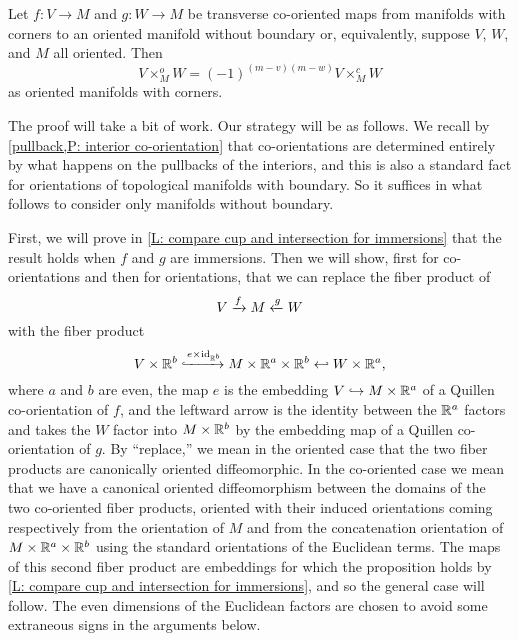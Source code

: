 \begin{proposition}\label{P: compare cup and intersection orientations}
	Let $f \colon V \to M$ and $g \colon W \to M$ be transverse co-oriented maps from manifolds with corners to an oriented manifold without boundary or, equivalently, suppose $V$, $W$, and $M$ all oriented.
	Then $$V \times_M^o W = (-1)^{(m-v)(m-w)} V \times_M^c W$$ as oriented manifolds with corners.
\end{proposition}

The proof will take a bit of work.
Our strategy will be as follows.
We recall by \cref{pullback,P: interior co-orientation} that co-orientations are determined entirely by what happens on the pullbacks of the interiors, and this is also a standard fact for orientations of topological manifolds with boundary.
So it suffices in what follows to consider only manifolds without boundary.

First, we will prove in \cref{L: compare cup and intersection for immersions} that the result holds when $f$ and $g$ are immersions.
Then we will show, first for co-orientations and then for orientations, that we can replace the fiber product of
$$V \xrightarrow{f} M \xleftarrow{g} W$$
with the fiber product
$$V \times \mathbb{R}^b \xhookrightarrow{e \times \mathrm{id}_{\mathbb{R}^b }} M \times \mathbb{R}^a \times \mathbb{R}^b \hookleftarrow W \times \mathbb{R}^a ,$$
where $a$ and $b$ are even, the map $e$ is the embedding $V \hookrightarrow M \times \mathbb{R}^a $ of a Quillen co-orientation of $f$, and the leftward arrow is the identity between the $\mathbb{R}^a $ factors and takes the $W$ factor into $M \times \mathbb{R}^b $ by the embedding map of a Quillen co-orientation of $g$.
By ``replace,'' we mean in the oriented case that the two fiber products are canonically oriented diffeomorphic.
In the co-oriented case we mean that we have a canonical oriented diffeomorphism
between the domains of the two co-oriented fiber products, oriented with their induced orientations coming respectively from the orientation of $M$ and from the concatenation orientation of $M \times \mathbb{R}^a \times \mathbb{R}^b $ using the standard orientations of the Euclidean terms.
The maps of this second fiber product are embeddings for which the proposition holds by \cref{L: compare cup and intersection for immersions}, and so the general case will follow.
The even dimensions of the Euclidean factors are chosen to avoid some extraneous signs in the arguments below.

